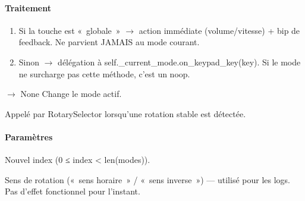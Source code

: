 \documentclass[letterpaper,10pt,french]{sphinxmanual}
\begin{document}
\begin{fulllineitems}
\begin{fulllineitems}
\paragraph{Traitement}
\label{\detokenize{api/core:traitement}}\begin{enumerate}
%
\item {} 
\sphinxAtStartPar
Si la touche est « globale » \(\rightarrow\) action immédiate (volume/vitesse)
+ bip de feedback. Ne parvient JAMAIS au mode courant.

\item {} 
\sphinxAtStartPar
Sinon \(\rightarrow\) délégation à self.\_current\_mode.on\_keypad\_key(key).
Si le mode ne surcharge pas cette méthode, c’est un no\sphinxhyphen{}op.

\end{enumerate}

\end{fulllineitems}


\begin{fulllineitems}
\label{\detokenize{api/core:core.mode_manager.ModeManager.set_index}}
\pysigstartsignatures
\pysiglinewithargsret
{}
{\sphinxparamcomma {}}
{{ $\rightarrow$ None}}
\pysigstopsignatures
\sphinxAtStartPar
Change le mode actif.

\sphinxAtStartPar
Appelé par RotarySelector lorsqu’une rotation stable est détectée.


\paragraph{Paramètres}
\label{\detokenize{api/core:id2}}\begin{description}
\sphinxAtStartPar
Nouvel index (0 ≤ index \textless{} len(modes)).

\sphinxAtStartPar
Sens de rotation (« sens horaire » / « sens inverse ») — utilisé
pour les logs. Pas d’effet fonctionnel pour l’instant.


\end{description}
\end{fulllineitems}
\end{fulllineitems}
\end{document}
